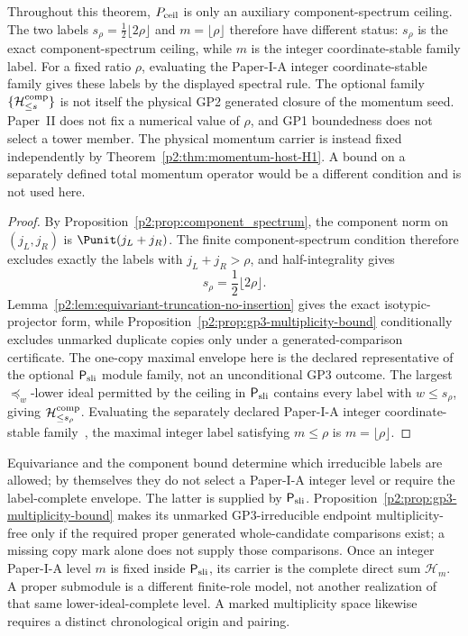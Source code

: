 \documentclass[11pt,a4paper]{article}
\begin{document}
\begin{theorem}
\begin{equation}
\end{equation}
Throughout this theorem, \(P_{\rm ceil}\) is only an auxiliary
component-spectrum ceiling.  The two
labels \(s_\rho=\frac12\lfloor2\rho\rfloor\) and
\(m=\lfloor\rho\rfloor\) therefore have different status: \(s_\rho\) is the
exact component-spectrum ceiling, while \(m\) is the integer coordinate-stable
family label.  For a fixed ratio \(\rho\), evaluating the Paper-I-A integer
coordinate-stable family gives these labels by the displayed spectral rule.
The optional family \(\{\mathcal H_{\le s}^{\rm comp}\}\) is not itself the physical
GP2 generated closure of the momentum seed.  Paper~II does not fix a numerical
value of \(\rho\), and GP1 boundedness does not select a tower member.  The
physical momentum carrier is instead fixed independently by
Theorem~\ref{p2:thm:momentum-host-H1}.  A bound on a separately defined total
momentum operator would be a different condition and is not used here.
\end{theorem}

\begin{proof}
By Proposition~\ref{p2:prop:component_spectrum}, the component norm on
\((j_L,j_R)\) is \(\Punit(j_L+j_R)\).  The finite component-spectrum
condition therefore excludes exactly the labels with
\(j_L+j_R>\rho\), and half-integrality gives
\[
 s_\rho=\frac12\lfloor2\rho\rfloor.
\]
Lemma~\ref{p2:lem:equivariant-truncation-no-insertion} gives the exact
isotypic-projector form, while
Proposition~\ref{p2:prop:gp3-multiplicity-bound} conditionally excludes
unmarked duplicate copies only under a generated-comparison certificate.
The one-copy maximal envelope here is the declared representative of the
optional \(\mathsf P_{\rm sli}\) module family, not an unconditional GP3
outcome.  The largest \(\preceq_w\)-lower ideal permitted by the ceiling in
\(\mathsf P_{\rm sli}\) contains every label with \(w\le s_\rho\), giving
\(\mathcal H_{\le s_\rho}^{\rm comp}\).  Evaluating the separately declared
Paper-I-A integer coordinate-stable family~\cite{Kugelmann2026a}, the maximal
integer label satisfying \(m\le\rho\) is \(m=\lfloor\rho\rfloor\).
\end{proof}

\begin{remark}
\label{p2:rem:maximal-envelope-versus-realized-carrier}
Equivariance and the component bound determine which irreducible labels are
allowed; by themselves they do not select a Paper-I-A integer level or require
the label-complete envelope.  The latter is supplied by
\(\mathsf P_{\rm sli}\).  Proposition~\ref{p2:prop:gp3-multiplicity-bound}
makes its unmarked GP3-irreducible endpoint multiplicity-free only if
the required proper generated whole-candidate comparisons exist; a missing
copy mark alone does not supply those comparisons.  Once an integer Paper-I-A level
\(m\) is fixed inside \(\mathsf P_{\rm sli}\), its carrier is the complete
direct sum \(\mathcal H_m\).  A proper submodule is a different finite-role
model, not another realization of that same lower-ideal-complete level.  A
marked multiplicity space likewise requires a distinct chronological origin
and pairing.
\end{remark}
\end{document}
